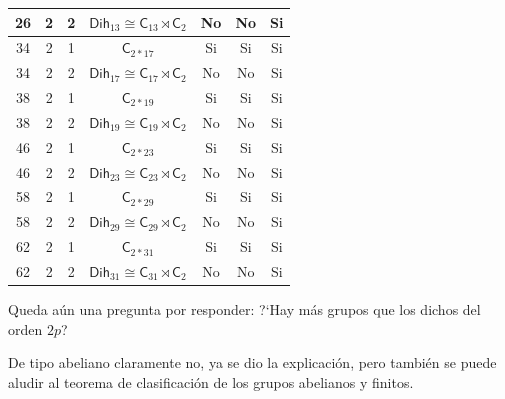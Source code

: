 \documentclass[final,12pt,a4paper,twoside,fleqn]{extbook}
\theoremstyle{definition}
\theoremstyle{remark}
\begin{document}
\begin{table}[h!]
\begin{center}
\begin{tabular}{c|c|c|c|c|c|c}
            \hline
            26 & 2 & 2  & ${{\textsf{Dih}}_{13}}                    \cong                    {{\textsf{C}}_{13}}\rtimes{{{\textsf{C}}_{2}}}$ & No & No & Si \\
            \hline
            34 & 2 & 1 & ${\textsf{C}}_{2*17}$ & Si & Si & Si \\
            \hline
            34 & 2 & 2  & ${{\textsf{Dih}}_{17}}                    \cong                    {{\textsf{C}}_{17}}\rtimes{{{\textsf{C}}_{2}}}$ & No & No & Si \\
            \hline
            38 & 2 & 1 & ${\textsf{C}}_{2*19}$ & Si & Si & Si \\
            \hline
            38 & 2 & 2  & ${{\textsf{Dih}}_{19}}                    \cong                    {{\textsf{C}}_{19}}\rtimes{{{\textsf{C}}_{2}}}$ & No & No & Si \\
            \hline
            46 & 2 & 1 & ${\textsf{C}}_{2*23}$ & Si & Si & Si \\
            \hline
            46 & 2 & 2  & ${{\textsf{Dih}}_{23}}                    \cong                    {{\textsf{C}}_{23}}\rtimes{{{\textsf{C}}_{2}}}$ & No & No & Si \\
            \hline
            58 & 2 & 1 & ${\textsf{C}}_{2*29}$ & Si & Si & Si \\
            \hline
            58 & 2 & 2  & ${{\textsf{Dih}}_{29}}                    \cong                    {{\textsf{C}}_{29}}\rtimes{{{\textsf{C}}_{2}}}$ & No & No & Si \\
            \hline
            62 & 2 & 1 & ${\textsf{C}}_{2*31}$ & Si & Si & Si \\
            \hline
            62 & 2 & 2  & ${{\textsf{Dih}}_{31}}                    \cong                    {{\textsf{C}}_{31}}\rtimes{{{\textsf{C}}_{2}}}$ & No & No & Si \\
            \hline
        \end{tabular}
    \end{center}
\end{table}








    Queda a\'un una pregunta por responder: ?`Hay m\'as grupos que los dichos del orden $2p$?

    De tipo abeliano claramente no, ya se dio la explicaci\'on, pero tambi\'en se puede aludir al teorema de
    clasificaci\'on de los grupos abelianos y finitos.
\end{document}
